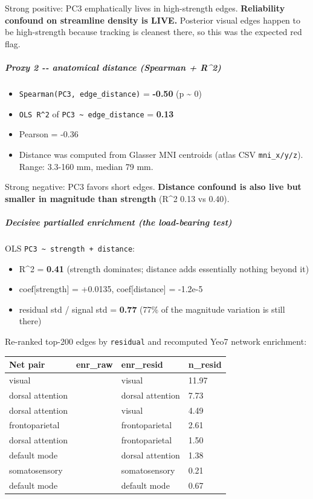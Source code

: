 Strong positive: PC3 emphatically lives in high-strength edges. \textbf{Reliability confound on streamline density is LIVE.} Posterior visual edges happen to be high-strength because tracking is cleanest there, so this was the expected red flag.

\subparagraph{Proxy 2 -\/- anatomical distance (Spearman + R\^{}2)}\label{proxy-2----anatomical-distance-spearman--r2}

\begin{itemize}
\tightlist
\item
  \texttt{Spearman(\textbar{}PC3\textbar{},\ edge\_distance)} = \textbf{-0.50} (p \textasciitilde{} 0)
\item
  \texttt{OLS\ R\^{}2} of \texttt{\textbar{}PC3\textbar{}\ \textasciitilde{}\ edge\_distance} = \textbf{0.13}
\item
  Pearson = -0.36
\item
  Distance was computed from Glasser MNI centroids (atlas CSV \texttt{mni\_x/y/z}). Range: 3.3-160 mm, median 79 mm.
\end{itemize}

Strong negative: PC3 favors short edges. \textbf{Distance confound is also live but smaller in magnitude than strength} (R\^{}2 0.13 vs 0.40).

\subparagraph{Decisive partialled enrichment (the load-bearing test)}\label{decisive-partialled-enrichment-the-load-bearing-test}

OLS \texttt{\textbar{}PC3\textbar{}\ \textasciitilde{}\ strength\ +\ distance}:

\begin{itemize}
\tightlist
\item
  R\^{}2 = \textbf{0.41} (strength dominates; distance adds essentially nothing beyond it)
\item
  coef{[}strength{]} = +0.0135, coef{[}distance{]} = -1.2e-5
\item
  residual std / signal std = \textbf{0.77} (77\% of the magnitude variation is still there)
\end{itemize}

Re-ranked top-200 edges by \texttt{\textbar{}residual\textbar{}} and recomputed Yeo7 network enrichment:

{\def\LTcaptype{none} %
\begin{longtable}[]{@{}llll@{}}
\toprule\noalign{}
Net pair & enr\_raw & enr\_resid & n\_resid \\
\midrule\noalign{}
\endhead
\bottomrule\noalign{}
\endlastfoot
visual & & visual & 11.97 \\
dorsal attention & & dorsal attention & 7.73 \\
dorsal attention & & visual & 4.49 \\
frontoparietal & & frontoparietal & 2.61 \\
dorsal attention & & frontoparietal & 1.50 \\
default mode & & dorsal attention & 1.38 \\
somatosensory & & somatosensory & 0.21 \\
default mode & & default mode & 0.67 \\
\end{longtable}
}

